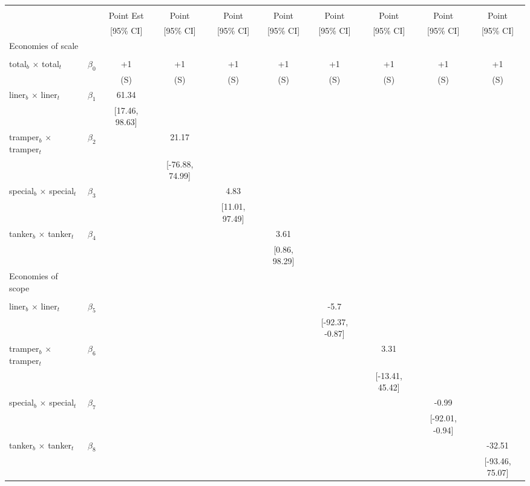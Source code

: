 \begin{tabular}{@{\extracolsep{5pt}}lccccccccc}
\toprule 
 &  &  &  &  &  &  &  &  &  \\
 &  & Point Est & Point & Point & Point & Point & Point & Point & Point \\
 &  & [95\% CI] & [95\% CI] & [95\% CI] & [95\% CI] & [95\% CI] & [95\% CI] & [95\% CI] & [95\% CI] \\
\midrule 
Economies of scale &  &  &  &  &  &  &  \\
 &  &  &  &  &  &  &  &  \\
total$_{b}$ $\times$ total$_{t}$ & $\beta_0$ & +1 & +1 & +1 & +1 & +1 & +1 & +1 & +1 \\
 &  & (S) & (S) & (S) & (S) & (S) & (S) & (S) & (S) \\
liner$_{b}$ $\times$ liner$_{t}$ & $\beta_1$ & 61.34 &  &  &  &  &  &  &  \\
 &  & [17.46, 98.63] &  &  &  &  &  &  &  \\
tramper$_{b}$ $\times$ tramper$_{t}$ & $\beta_2$ &  & 21.17 &  &  &  &  &  &  \\
 &  &  & [-76.88, 74.99] &  &  &  &  &  &  \\
special$_{b}$ $\times$ special$_{t}$ & $\beta_3$ &  &  & 4.83 &  &  &  &  &  \\
 &  &  &  & [11.01, 97.49] &  &  &  &  &  \\
tanker$_{b}$ $\times$ tanker$_{t}$ & $\beta_4$ &  &  &  & 3.61 &  &  &  &  \\
 &  &  &  &  & [0.86, 98.29] &  &  &  &  \\
Economies of scope &  &  &  &  &  &  &  &  &  \\
 &  &  &  &  &  &  &  &  &  \\
liner$_{b}$ $\times$ liner$_{t}$ & $\beta_5$ &  &  &  &  & -5.7 &  &  &  \\
 &  &  &  &  &  & [-92.37, -0.87] &  &  &  \\
tramper$_{b}$ $\times$ tramper$_{t}$ & $\beta_6$ &  &  &  &  &  & 3.31 &  &  \\
 &  &  &  &  &  &  & [-13.41, 45.42] &  &  \\
special$_{b}$ $\times$ special$_{t}$ & $\beta_7$ &  &  &  &  &  &  & -0.99 &  \\
 &  &  &  &  &  &  &  & [-92.01, -0.94] &  \\
tanker$_{b}$ $\times$ tanker$_{t}$ & $\beta_8$ &  &  &  &  &  &  &  & -32.51 \\
 &  &  &  &  &  &  &  &  & [-93.46, 75.07] \\

\end{tabular}
